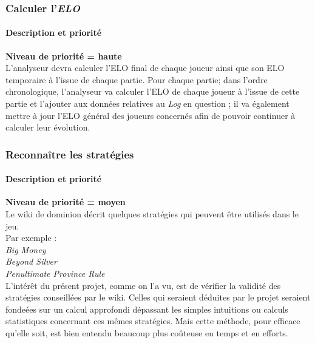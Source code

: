 \subsubsection{Calculer l'\textit{\textbf{ELO}}}
\paragraph*{Description et priorité}
\textbf{Niveau de priorité = haute}\\

L'analyseur devra calculer l'ELO final de chaque joueur ainsi que son ELO temporaire à l'issue de chaque partie.\newline
Pour chaque partie; dans l'ordre chronologique, l'analyseur va calculer l'ELO de chaque joueur à l'issue de cette partie et l'ajouter aux données relatives au \textit{Log} en question ; il va également mettre à jour l'ELO général des joueurs concernés afin de pouvoir continuer à calculer leur évolution.

\subsubsection{Reconnaître les stratégies}
\paragraph*{Description et priorité}
\textbf{Niveau de priorité = moyen}\\

Le wiki de dominion décrit quelques stratégies qui peuvent être utilisés dans le jeu.\\Par exemple :\\
\textit{Big Money}\\
\textit{Beyond Silver}\\
\textit{Penultimate Province Rule}\\
L'intérêt du présent projet, comme on l'a vu, est de vérifier la validité des stratégies conseillées par le wiki. Celles qui seraient déduites par le projet seraient fondeées sur un calcul approfondi dépassant les simples intuitions ou calculs statistiques concernant ces mêmes stratégies. Mais cette méthode, pour efficace qu'elle soit, est bien entendu beaucoup plus coûteuse en temps et en efforts.
\\

